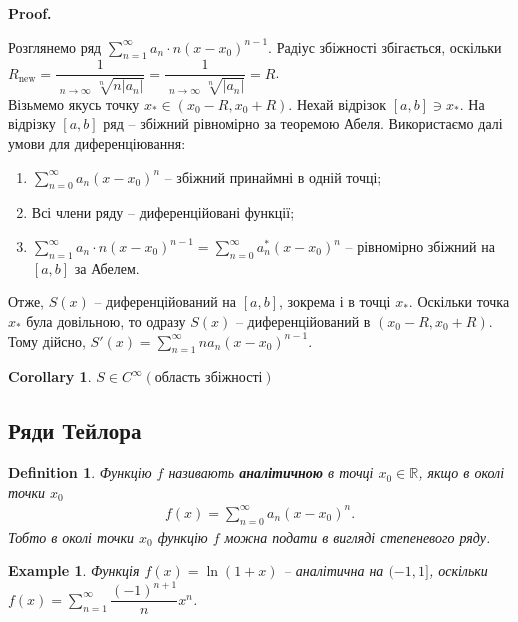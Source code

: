 \documentclass[a4paper, 10pt]{article}
\makeatletter
\DeclareMathOperator*\uplim{\overline{lim}}
\def\huge{\displaystyle}
\theoremstyle{theoremdd}
\theoremstyle{theoremdd}
\theoremstyle{theoremdd}
\newtheorem{definition}[theorem]{Definition}
\theoremstyle{theoremdd}
\theoremstyle{theoremdd}
\newtheorem{example}[theorem]{Example}
\theoremstyle{theoremdd}
\theoremstyle{theoremdd}
\theoremstyle{theoremdd}
\theoremstyle{theoremdd}
\newtheorem{corollary}[theorem]{Corollary}
\renewenvironment{proof}[1][Proof.\\]{\par
\pushQED{\hfill \qed}%
\normalfont \topsep6\p@\@plus6\p@\relax
\trivlist
\item\relax
{\bfseries
#1\@addpunct{.}}\hspace\labelsep\ignorespaces
}{%
\popQED\endtrivlist\@endpefalse
}
\makeatother
\begin{document}
\begin{proof}
Розглянемо ряд $\huge \sum_{n=1}^\infty a_n\cdot n(x-x_0)^{n-1}$. Радіус збіжності збігається, оскільки\\
$ R_{\text{new}} = \dfrac{1}{\huge \uplim_{n \to \infty} \sqrt[n]{n |a_n|}} = \dfrac{1}{\huge \uplim_{n \to \infty} \sqrt[n]{|a_n|}} = R$.\\
Візьмемо якусь точку $x_* \in (x_0-R,x_0+R)$. Нехай відрізок $[a,b] \ni x_*$. На відрізку $[a,b]$ ряд -- збіжний рівномірно за теоремою Абеля. Використаємо далі умови для диференціювання:
\begin{enumerate}[nosep,wide=0pt,label={\arabic*)}]
\item $\huge \sum_{n=0}^\infty a_n(x-x_0)^n$ -- збіжний принаймні в одній точці;\\
\item Всі члени ряду -- диференційовані функції;\\
\item $\huge \sum_{n=1}^\infty a_n \cdot n(x-x_0)^{n-1} = \huge\sum_{n=0}^\infty a_n^* (x-x_0)^n$ -- рівномірно збіжний на $[a,b]$ за Абелем.
\end{enumerate}
Отже, $S(x)$ -- диференційований на $[a,b]$, зокрема і в точці $x_*$. Оскільки точка $x_*$ була довільною, то одразу $S(x)$ -- диференційований в $(x_0-R,x_0+R)$.\\
Тому дійсно, $S'(x) = \huge \sum_{n=1}^\infty n a_n (x-x_0)^{n-1}$.
\end{proof}

\begin{corollary}
$S \in C^{\infty}(\text{область збіжності})$
\end{corollary}

\subsection{Ряди Тейлора}
\begin{definition}
Функцію $f$ називають \textbf{аналітичною} в точці $x_0 \in \mathbb{R}$, якщо в околі точки $x_0$
\begin{align*}
f(x) = \huge\sum_{n=0}^\infty a_n(x-x_0)^n.
\end{align*}
Тобто в околі точки $x_0$ функцію $f$ можна подати в вигляді степеневого ряду.
\end{definition}

\begin{example}
Функція $f(x) = \ln (1+x)$ -- аналітична на $(-1,1]$, оскільки $f(x) = \huge\sum_{n=1}^\infty \dfrac{(-1)^{n+1}}{n} x^n$.
\end{example}
\end{document}
